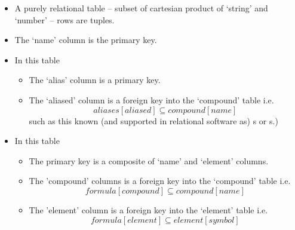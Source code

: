 


\begin{frame}
\begin{center}
\scalebox{0.75}{

}
\end{center}
\begin{itemize}
	\item A purely relational table -- subset of cartesian product of `string' and `number' --  rows are tuples.  
	\item The `name' column is the primary key. 
\end{itemize}
\end{frame}
\begin{frame}
\begin{center}
\scalebox{0.75}{

}
\end{center}
\begin{itemize}
\item	In this table
\begin{itemize}
	\item The `alias' column is a primary key.
	\item The `aliased' column is a foreign key into the `compound' table i.e.
	\begin{equation}
	               aliases[aliased] \subseteq compound[name] 
	\end{equation}
	such as this known (and supported in relational software as) s or s.) 
\end{itemize}
\end{itemize}
\end{frame}
\begin{frame}
\begin{center}
\scalebox{0.75}{

}
\end{center}
\begin{itemize}
	\item In this table 
	\begin{itemize}
	\item The primary key is a composite of `name' and `element' columns.  
	\item The 'compound' columns is a foreign key into the `compound' table i.e.
	\begin{equation}
	              formula[compound] \subseteq compound[name]
	\end{equation}
	\item The 'element' column is a foreign key into the `element' table i.e.
	\begin{equation}
	              formula[element] \subseteq element[symbol]
	\end{equation}
    \end{itemize}
\end{itemize}
\end{frame}


